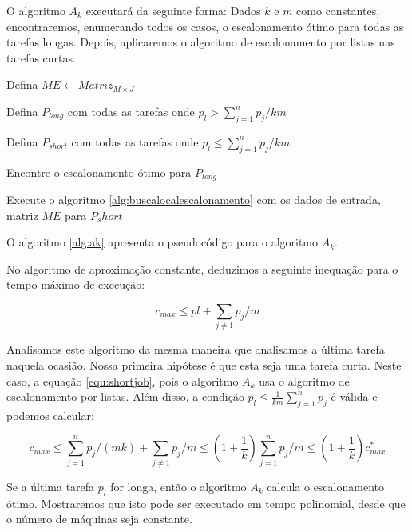 O algoritmo $A_k$ executará da seguinte forma: Dados $k$ e $m$ como constantes, encontraremos, enumerando todos os casos, o escalonamento ótimo para todas as tarefas longas. Depois, aplicaremos o algoritmo de escalonamento por listas nas tarefas curtas.

\begin{algorithm}[H]
\SetAlgoLined
{}

Defina $ME \leftarrow Matriz_{M \times J}$

Defina $P_{long}$ com todas as tarefas onde $p_l > \sum_{j=1}^{n} p_j / km$

Defina $P_{short}$ com todas as tarefas onde $p_l \leq \sum_{j=1}^{n} p_j / km$

Encontre o escalonamento ótimo para $P_{long}$

Execute o algoritmo \ref{alg:buscalocalescalonamento} com os dados de entrada, matriz $ME$ para $P_short$

\caption{$A_k$}
\label{alg:ak}
\end{algorithm}

O algoritmo \ref{alg:ak} apresenta o pseudocódigo para o algoritmo $A_k$.

No algoritmo de aproximação constante, deduzimos a seguinte inequação para o tempo máximo de execução:

\begin{equation}
\label{equ:shortjob}
c_{max} \leq pl + \sum_{j \neq 1} p_j / m
\end{equation}

Analisamos este algoritmo da mesma maneira que analisamos a última tarefa naquela ocasião. Nossa primeira hipótese é que esta seja uma tarefa curta. Neste caso, a equação \ref{equ:shortjob}, pois o algoritmo $A_k$ usa o algoritmo de escalonamento por listas. Além disso, a condição $p_l \leq \frac{1}{km} \sum_{j=1}^{n} p_j$ é válida e podemos calcular: 

\begin{equation}
c_{max} \leq \sum_{j = 1}^{n} p_j / (mk) + \sum_{j \neq 1} p_j / m \leq \left(1 + \frac{1}{k}\right) \sum_{j=1}^{n} p_j/m \leq \left(1 + \frac{1}{k}\right) c_{max}^*
\end{equation}

Se a última tarefa $p_l$ for longa, então o algoritmo $A_k$ calcula o escalonamento ótimo. Mostraremos que isto pode ser executado em tempo polinomial, desde que o número de máquinas seja constante.

